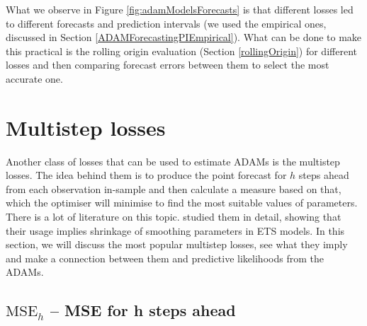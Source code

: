 \documentclass[
]{book}
\theoremstyle{definition}
\theoremstyle{definition}
\theoremstyle{definition}
\theoremstyle{definition}
\theoremstyle{remark}
\begin{document}
What we observe in Figure \ref{fig:adamModelsForecasts} is that different losses led to different forecasts and prediction intervals (we used the empirical ones, discussed in Section \ref{ADAMForecastingPIEmpirical}). What can be done to make this practical is the rolling origin evaluation (Section \ref{rollingOrigin}) for different losses and then comparing forecast errors between them to select the most accurate one.

\hypertarget{multistepLosses}{%
\section{Multistep losses}\label{multistepLosses}}

Another class of losses that can be used to estimate ADAMs is the multistep losses. The idea behind them is to produce the point forecast for \(h\) steps ahead from each observation in-sample and then calculate a measure based on that, which the optimiser will minimise to find the most suitable values of parameters. There is a lot of literature on this topic. \citet{Svetunkov2020Multistep} studied them in detail, showing that their usage implies shrinkage of smoothing parameters in ETS models. In this section, we will discuss the most popular multistep losses, see what they imply and make a connection between them and predictive likelihoods from the ADAMs.

\hypertarget{mathrmmse_h-mse-for-h-steps-ahead}{%
\subsection{\texorpdfstring{\(\mathrm{MSE}_h\) -- MSE for h steps ahead}{\textbackslash mathrm\{MSE\}\_h -- MSE for h steps ahead}}\label{mathrmmse_h-mse-for-h-steps-ahead}}
\end{document}
